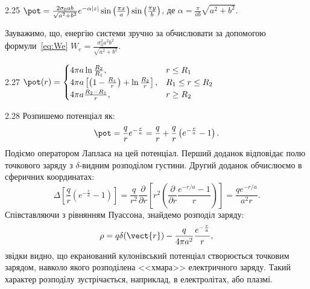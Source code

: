 \begin{Solution}{2.{25}}
	$\pot  = \frac{{2{\sigma _0}ab}}{{\sqrt {{a^2} + {b^2}} }}{e^{ - \alpha |z|}}\sin \left( {\frac{{\pi x}}{a}} \right)\sin \left( {\frac{{\pi y}}{b}} \right)$, де $\alpha  = \frac{\pi }{{ab}}\sqrt {{a^2} + {b^2}}$.

    Зауважимо, що, енергію системи зручно за обчислювати за допомогою формули~\eqref{eq:We}
	$W_e =  \frac{{\sigma _0^2{a^2}{b^2}}}{{\sqrt {{a^2} + {b^2}} }}$.
\end{Solution}
\begin{Solution}{2.{27}}
	$
		\pot(r) =
		\begin{cases}
			4\pi a\ln\frac{R_2}{R_1},                                                  & r \le R_1         \\
			4\pi a \left[ \left( 1- \frac{R_1}{r}\right)  + \ln\frac{R_2}{r} \right] , & R_1 \le r \le R_2 \\
			4\pi a \frac{R_2 - R_1}{r},                                                & r \ge R_2
		\end{cases}
	$
\end{Solution}
\begin{Solution}{2.{28}}
	Розпишемо потенціал як:
    \[
	\pot = \frac{q}{r}e^{-\frac{r}{a}} = \frac{q}{r} +  \frac{q}{r}\left(e^{-\frac{r}{a}} - 1\right) .
    \]
    Подіємо оператором Лапласа на цей потенціал. Перший доданок відповідає полю точкового заряду з  $\delta$-видним розподілом густини. Другий доданок обчислюємо в сферичних координатах:
    \[
        \Delta \left[\frac{q}{r}\left(e^{-\frac{r}{a}} - 1\right) \right] =
    \frac{q}{r^2}\frac{\partial}{\partial r}\left[ r^2\left( \frac{\partial }{\partial r}\frac{e^{-r/a} - 1}{r} \right) \right] = \frac{qe^{-r/a}}{a^2r}.
    \]
	Співставляючи з рівнянням Пуассона, знайдемо розподіл заряду:
	\[
		\rho = q\delta(\vect{r}) - \frac{q}{4\pi a^2} \frac{e^{-\frac{r}{a}}}{r},
	\]
	звідки видно, що екранований кулонівський потенціал створюється точковим зарядом, навколо якого розподілена <<хмара>> електричного заряду. Такий характер розподілу зустрічається, наприклад, в електролітах, або плазмі.
\end{Solution}
